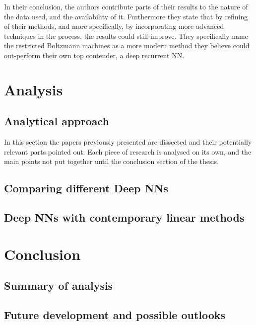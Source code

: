 In their conclusion, the authors contribute parts of their results to the nature of the data used, and the availability of it. Furthermore they state that by refining of their methods, and more specifically, by incorporating more advanced techniques in the process, the results could still improve. They specifically name the restricted Boltzmann machines as a more modern method they believe could out-perform their own top contender, a deep recurrent NN.




\newpage

\section{Analysis}

\subsection{Analytical approach}

In this section the papers previously presented are dissected and their potentially relevant parts pointed out.
Each piece of research is analysed on its own, and the main points not put together until the conclusion section of the thesis.
 


\subsection{Comparing different Deep NNs}

\subsection{Deep NNs with contemporary linear methods}


\newpage

\section{Conclusion}

\subsection{Summary of analysis}

\subsection{Future development and possible outlooks}

